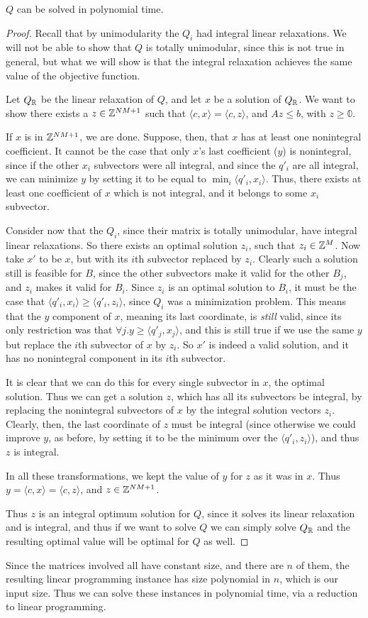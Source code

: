 \begin{prop}
$Q$ can be solved in polynomial time.
\end{prop}

\begin{proof}
Recall that by unimodularity the $Q_i$ had integral linear relaxations. We will not be able to show that $Q$ is totally unimodular, since this is not true in general, but what we will show is that the integral relaxation achieves the same value of the objective function.

Let $Q_{\mathbb{R}}$ be the linear relaxation of $Q$, and let $x$ be a solution of $Q_{\mathbb{R}}$. We want to show there exists a $z \in \mathbb{Z}^{NM+1}$ such that $\langle c, x \rangle = \langle c, z \rangle$, and $Az \le b$, with $z \ge \mathbb{0}$.

If $x$ is in $\mathbb{Z}^{NM+1}$, we are done. Suppose, then, that $x$ has at least one nonintegral coefficient. It cannot be the case that only $x$'s last coefficient ($y$) is nonintegral, since if the other $x_i$ subvectors were all integral, and since the $q'_i$ are all integral, we can minimize $y$ by setting it to be equal to $\min_i \langle q'_i, x_i \rangle$. Thus, there exists at least one coefficient of $x$ which is not integral, and it belongs to some $x_i$ subvector.

Consider now that the $Q_i$, since their matrix is totally unimodular, have integral linear relaxations. So there exists an optimal solution $z_i$, such that $z_i \in \mathbb{Z}^M$. Now take $x'$ to be $x$, but with its $i$th subvector replaced by $z_i$. Clearly such a solution still is feasible for $B$, since the other subvectors make it valid for the other $B_j$, and $z_i$ makes it valid for $B_i$. Since $z_i$ is an optimal solution to $B_i$, it must be the case that $\langle q'_i, x_i \rangle \ge \langle q'_i, z_i \rangle$, since $Q_i$ was a minimization problem. This means that the $y$ component of $x$, meaning its last coordinate, is \emph{still} valid, since its only restriction was that $\forall j. y \ge \langle q'_j, x_j \rangle$, and this is still true if we use the same $y$ but replace the $i$th subvector of $x$ by $z_i$. So $x'$ is indeed a valid solution, and it has no nonintegral component in its $i$th subvector.

It is clear that we can do this for every single subvector in $x$, the optimal solution. Thus we can get a solution $z$, which has all its subvectors be integral, by replacing the nonintegral subvectors of $x$ by the integral solution vectors $z_i$. Clearly, then, the last coordinate of $z$ must be integral (since otherwise we could improve $y$, as before, by setting it to be the minimum over the $\langle q'_i, z_i \rangle$), and thus $z$ is integral.

In all these transformations, we kept the value of $y$ for $z$ as it was in $x$. Thus $y = \langle c, x \rangle = \langle c, z \rangle$, and $z \in \mathbb{Z}^{NM+1}$.

Thus $z$ is an integral optimum solution for $Q$, since it solves its linear relaxation and is integral, and thus if we want to solve $Q$ we can simply solve $Q_{\mathbb{R}}$ and the resulting optimal value will be optimal for $Q$ as well.
\end{proof}

Since the matrices involved all have constant size, and there are $n$ of them, the resulting linear programming instance has size polynomial in $n$, which is our input size. Thus we can solve these instances in polynomial time, via a reduction to linear programming.
